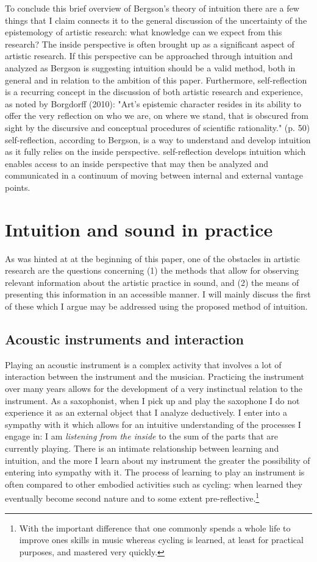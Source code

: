 \documentclass[11pt]{article}
\makeatletter
\newcommand{\cslcitation}[2]
 {\protect\hyper@linkstart{cite}{citeproc_bib_item_#1}#2\hyper@linkend}
\makeatother
\begin{document}
To conclude this brief overview of Bergson's theory of intuition there are a few things that I claim connects it to the general discussion of the uncertainty of the epistemology of artistic research: what knowledge can we expect from this research? The inside perspective is often brought up as a significant aspect of artistic research.
If this perspective can be approached through intuition and analyzed as Bergson is suggesting intuition should be a valid method, both in general and in relation to the ambition of this paper.
Furthermore, self-reflection is a recurring concept in the discussion of both artistic research and experience, as noted by Borgdorff (\cslcitation{5}{2010}): "Art’s epistemic character resides in its ability to offer the very reflection on who we
are, on where we stand, that is obscured from sight by the discursive and conceptual
procedures of scientific rationality." (p. 50)
self-reflection, according to Bergson, is a way to understand and develop intuition as it fully relies on the inside perspective.
self-reflection develops intuition which enables access to an inside perspective that may then be analyzed and communicated in a continuum of moving between internal and external vantage points.
\section*{Intuition and sound in practice}
\label{sec:org3be775d}
As was hinted at at the beginning of this paper, one of the obstacles in artistic research are the questions concerning (1) the methods that allow for observing relevant information about the artistic practice in sound, and (2) the means of presenting this information in an accessible manner.
I will mainly discuss the first of these which I argue may be addressed using the proposed method of intuition.
\subsection*{Acoustic instruments and interaction}
\label{sec:org4868876}
Playing an acoustic instrument is a complex activity that involves a lot of interaction between the instrument and the musician. Practicing the instrument over many years allows for the development of a very instinctual relation to the instrument.
As a saxophonist, when I pick up and play the saxophone I do not experience it as an external object that I analyze deductively.
I enter into a sympathy with it which allows for an intuitive understanding of the processes I engage in: I am \emph{listening from the inside} to the sum of the parts that are currently playing.
There is an intimate relationship between learning and intuition, and the more I learn about my instrument the greater the possibility of entering into sympathy with it.
The process of learning to play an instrument is often compared to other embodied activities such as cycling: when learned they eventually become second nature and to some extent pre-reflective.\footnote{With the important difference that one commonly spends a whole life to improve ones skills in music whereas cycling is learned, at least for practical purposes, and mastered very quickly.}
\end{document}
